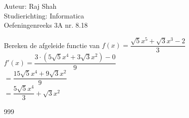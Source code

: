 \documentclass[a4paper]{article}
\begin{document}
  
\noindent \large Auteur: Raj Shah \\
\noindent \large Studierichting: Informatica\\
\noindent \large Oefeningenreeks 3A nr. 8.18\\

\medskip

\normalsize

Bereken de afgeleide functie van $f(x) = \dfrac{\sqrt{5}x^5 + \sqrt{3}x^3 - 2}{3}$\\

$f'(x) = \dfrac{3 \cdot (5\sqrt{5}x^4 + 3\sqrt{3}x^2) - 0}{9} $\\ 

	$ = \dfrac{15\sqrt{5}x^4 + 9\sqrt{3}x^2}{9}$\\ 
	
	$ = \dfrac{5\sqrt{5}x^4}{3} + \sqrt{3}x^2$\\

\begin{thebibliography}{999}
\end{thebibliography}
\end{document}

